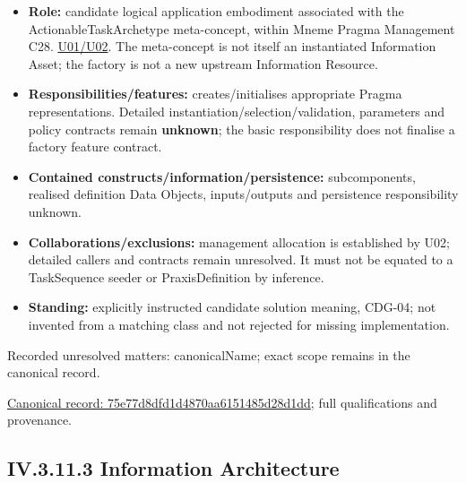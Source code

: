 \begin{itemize}


\item \textbf{Role:} candidate logical application embodiment associated with the
  ActionableTaskArchetype meta-concept, within Mneme Pragma Management C28.
  \href{\detokenize{../../../../../../../../../docs/markdown/05-information-systems-architecture/sources.md#u02}}{U01/U02}. The meta-concept is not itself an instantiated
  Information Asset; the factory is not a new upstream Information Resource.

\item \textbf{Responsibilities/features:} creates/initialises appropriate Pragma
  representations. Detailed instantiation/selection/validation, parameters and
  policy contracts remain \textbf{unknown}; the basic responsibility does not finalise
  a factory feature contract.

\item \textbf{Contained constructs/information/persistence:} subcomponents, realised
  definition Data Objects, inputs/outputs and persistence responsibility unknown.

\item \textbf{Collaborations/exclusions:} management allocation is established by U02;
  detailed callers and contracts remain unresolved. It must not be equated to a
  TaskSequence seeder or PraxisDefinition by inference.

\item \textbf{Standing:} explicitly instructed candidate solution meaning, CDG-04; not
  invented from a matching class and not rejected for missing implementation.

\end{itemize}

{\small Recorded unresolved matters: canonicalName; exact scope remains in the canonical record.}\par
{\footnotesize \href{../../../../../../../../continuum/application/application-component/75e77d8dfd1d4870aa6151485d28d1dd.md}{Canonical record: 75e77d8dfd1d4870aa6151485d28d1dd}; full qualifications and provenance.}\par
\subsection*{IV.3.11.3 Information Architecture}
\label{navigation:IV.3.11.3}

